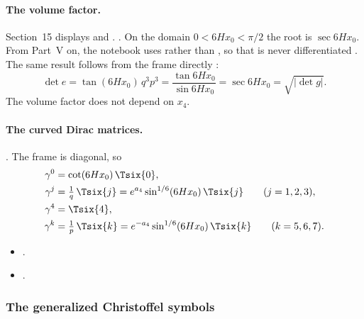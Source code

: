 \paragraph{The volume factor.} Section~15 displays  and
 . 
. On the domain
$0<6Hx_0<\pi/2$ the root is $\sec 6Hx_0$. From Part~V on, the notebook uses
 rather than , so that  is
never differentiated . The same result follows from the frame directly
\cfderived:
\begin{equation}
  \det e=\tan(6Hx_0)\,q^3p^3=\frac{\tan 6Hx_0}{\sin 6Hx_0}=\sec 6Hx_0=\sqrt{|\det g|}.
\end{equation}
The volume factor does not depend on $x_4$.

\paragraph{The curved Dirac matrices.} .
The frame is diagonal, so \cfderived
\begin{equation}
\begin{aligned}
  \gamma^0&=\cot(6Hx_0)\,\Tsix{0},\\
  \gamma^j&=\tfrac1q\,\Tsix{j}=e^{a_4}\sin^{1/6}(6Hx_0)\,\Tsix{j}\qquad(j=1,2,3),\\
  \gamma^4&=\Tsix{4},\\
  \gamma^k&=\tfrac1p\,\Tsix{k}=e^{-a_4}\sin^{1/6}(6Hx_0)\,\Tsix{k}\qquad(k=5,6,7).
\end{aligned}
\end{equation}
\begin{itemize}
  \item {} .
  \item {} .
\end{itemize}

\subsubsection{The generalized Christoffel symbols}
\label{csc:christoffel}\label{sec:3.8.4}

